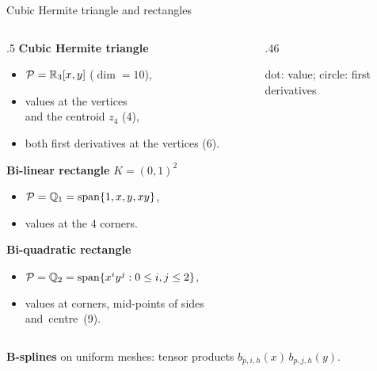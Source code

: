 \begin{frame}{Cubic Hermite triangle and rectangles}
    \small
    \begin{columns}[T,onlytextwidth]
        \begin{column}{.5\textwidth}
            \textbf{Cubic Hermite triangle}
            \begin{itemize}
                \item $\mathcal P = {\mathbb R}_3[x,y]$ ($\dim = 10$),
                \item values at the vertices\\ and the centroid $z_4$ (4),
                \item both first derivatives at the vertices (6).
            \end{itemize}
            \textbf{Bi-linear rectangle} $K = (0,1)^2$
            \begin{itemize}
                \item $\mathcal P = \mathbb Q_1 = \operatorname{span}\{1, x, y, xy\}$,
                \item values at the 4 corners.
            \end{itemize}
            \textbf{Bi-quadratic rectangle}
            \begin{itemize}
                \item $\mathcal P = \mathbb Q_2 = \operatorname{span}\{x^iy^j : 0 \le i,j \le 2\}$,
                \item values at corners, mid-points of sides \mbox{and centre (9).}
            \end{itemize}
        \end{column}
        \begin{column}{.46\textwidth}
            \centering

            {\scriptsize dot: value; circle: first derivatives}
        \end{column}
    \end{columns}
    \medskip
    \textbf{B-splines} on uniform meshes: tensor products $b_{p,i,h}(x)\, b_{p,j,h}(y)$.
\end{frame}

